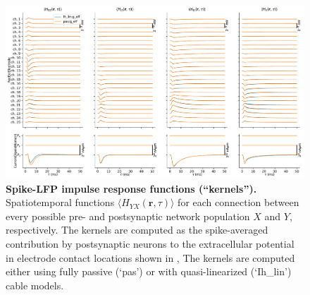 \begin{figure}[!ht]
\begin{center}
\includegraphics[width=\textwidth]{Figures/Ch-LFPy/Ch-LFPy-kernels.pdf}
\end{center}
\caption{\textbf{Spike-LFP  impulse response functions (``kernels'').}
Spatiotemporal functions $\langle H_{YX}(\mathbf{r}, \tau) \rangle$ for each connection between every possible pre- and postsynaptic network population $X$ and $Y$, respectively.
The  kernels are computed as the spike-averaged contribution by postsynaptic neurons to the extracellular potential in electrode contact locations shown in , 
The kernels are computed either using fully passive (`pas') or with quasi-linearized (`Ih\_lin') cable models.
}
\label{fig:LFPy_kernels}
\end{figure}



